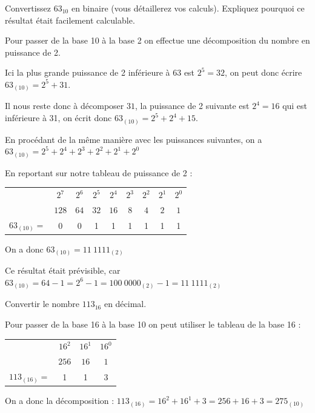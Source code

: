 \documentclass[a4paper, noanswers, addpoints, 12pt]{exam}
\begin{document}
\begin{questions}
\question[1] Convertissez $63_{10}$ en binaire (vous détaillerez vos calculs). Expliquez pourquoi ce résultat était facilement calculable.
\begin{solution}[5\bigskipamount]
     Pour passer de la base 10 à la base 2 on effectue une décomposition du nombre en puissance de 2.
     
     Ici la plus grande puissance de 2 inférieure à 63 est $2^5 = 32$, on peut donc écrire $63_{(10)} = 2^5 + 31$.
     
     Il nous reste donc à décomposer $31$, la puissance de 2 suivante est $2^4=16$ qui est inférieure à 31, on écrit donc $63_{(10)} = 2^5 + 2^4 + 15$.
     
     En procédant de la même manière avec les puissances suivantes, on a $63_{(10)} = 2^5 + 2^4 + 2^3 + 2^2 + 2^1 + 2^0$

     En reportant sur notre tableau de puissance de 2 :
    \begin{center}
     \begin{tabular}{lcccccccc}
        & $2^7$ & $2^6$ & $2^5$ & $2^4$ & $2^3$ & $2^2$ & $2^1$ & $2^0$\\
        & $128$ & $64$ & $32$ & $16$ & $8$ & $4$ & $2$ & $1$\\
        \hline
        $63_{(10)} = $ & 0 & 0 & 1 & 1 & 1 & 1 & 1 & 1\\
    \end{tabular}
    \end{center}

    On a donc $63_{(10)} = 11\ 1111_{(2)}$

    Ce résultat était prévisible, car $63_{(10)} = 64 - 1 = 2^6 - 1 = 100\ 0000_{(2)} - 1 = 11\ 1111_{(2)}$
\end{solution}

\question[1] Convertir le nombre $113_{16}$ en décimal.
\begin{solution}[5\bigskipamount]
     Pour passer de la base 16 à la base 10 on peut utiliser le tableau de la base 16 :
     \begin{center}
     \begin{tabular}{lccc}
        & $16^2$ & $16^1$ & $16^0$\\
        & $256$ & $16$ & $1$\\
        \hline
        $113_{(16)} = $ & 1 & 1 & 3\\
    \end{tabular}
    \end{center}

    On a donc la décomposition : $113_{(16)} = 16^2 + 16^1 + 3 = 256 + 16 + 3 = 275_{(10)}$ 
\end{solution}


\end{questions}
\end{document}
